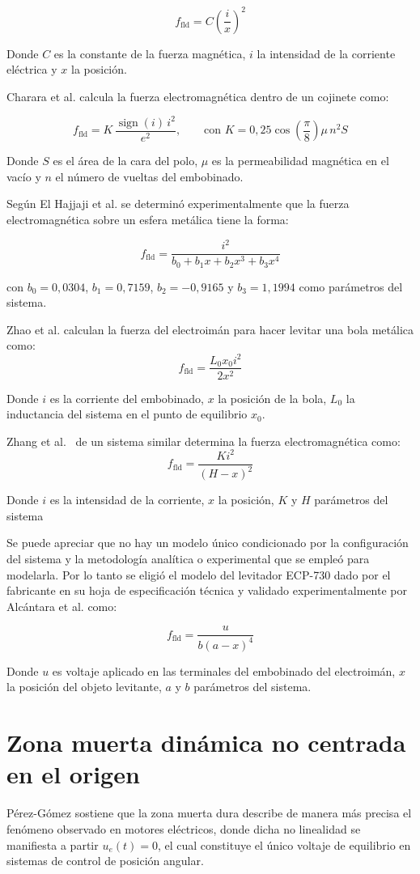 \[
f_{\text{fld}} = C\left(\dfrac{i}{x}\right)^2
\]

Donde $C$ es la constante de la fuerza magnética, $i$ la intensidad de la corriente eléctrica y $x$ la posición.

Charara et al. \cite{charara} calcula la fuerza electromagnética dentro de un cojinete como:

\[ 
f_{\text{fld}} = K\,\frac{\operatorname{sign}(i)\,i^{2}}{e^{2}}, 
\qquad \text{con } 
K = 0{,}25 \cos\!\left(\frac{\pi}{8}\right)\!\mu\, n^{2} S 
\]

Donde $S$ es el área de la cara del polo, $\mu$ es la permeabilidad magnética en el vacío y $n$ el número de vueltas del embobinado.

Según El Hajjaji et al. \cite{el} se determinó experimentalmente que la fuerza electromagnética sobre un esfera metálica tiene la forma:


\[ 
f_{\text{fld}} = \dfrac{i^{2}}{b_0 + b_1x + b_2x^3 + b_3x^4}
\]

con $b_0=0{,}0304$, $b_1=0{,}7159$, $b_2=-0{,}9165$ y $b_3=1{,}1994$ como parámetros del sistema.


Zhao et al. \cite{zhao} calculan la fuerza del electroimán para hacer levitar una bola metálica como:
\[ f_{\text{fld}} = \frac{L_0 x_0 i^2}{2x^2} \]

Donde $i$ es la corriente del embobinado, $x$ la posición de la bola, $L_0$ la inductancia del sistema en el punto de equilibrio $x_0$.

Zhang et al.\ \cite{feifei} de un sistema similar determina la fuerza electromagnética como:
\[ f_{\text{fld}} = \frac{K i^2}{(H - x)^2} \]

Donde $i$ es la intensidad de la corriente, $x$ la posición, $K$ y $H$ parámetros del sistema



Se puede apreciar que no hay un modelo único condicionado por la configuración del sistema y la metodología analítica o experimental que se empleó para modelarla. Por lo tanto se eligió 
el modelo del levitador ECP-730 dado por el fabricante en su hoja de especificación técnica \cite{parks} y validado experimentalmente por Alcántara et al. \cite{alcantara} como:

\[ f_{\text{fld}} = \frac{u}{b(a-x)^4} \]

Donde $u$ es voltaje aplicado en las terminales del embobinado del electroimán, $x$ la posición del objeto levitante, $a$ y $b$ parámetros del sistema.

\section{Zona muerta dinámica no centrada en el origen}
Pérez-Gómez \cite{perez} sostiene que la zona muerta dura describe de manera más precisa el fenómeno observado en motores eléctricos, 
donde dicha no linealidad se manifiesta a partir $u_e{(t)} = 0$, el cual constituye el único voltaje de equilibrio en sistemas de control de posición angular.


